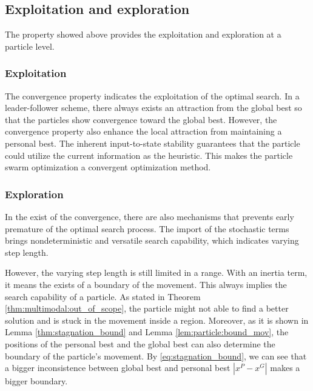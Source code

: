 \subsection{Exploitation and exploration}

The property showed above provides the exploitation and exploration at a particle level.

\subsubsection{Exploitation}

The convergence property indicates the exploitation of the optimal search.
In a leader-follower scheme, there always exists an attraction from the global best so that the particles show convergence toward the global best.
However, the convergence property also enhance the local attraction from maintaining a personal best.
The inherent input-to-state stability guarantees that the particle could utilize the current information as the heuristic.
This makes the particle swarm optimization a convergent optimization method.

\subsubsection{Exploration}

In the exist of the convergence, there are also mechanisms that prevents early premature of the optimal search process.
The import of the stochastic terms brings nondeterministic and versatile search capability, which indicates varying step length.

However, the varying step length is still limited in a range. 
With an inertia term, it means the exists of a boundary of the movement.
This always implies the search capability of a particle.
As stated in Theorem \ref{thm:multimodal:out_of_scope}, the particle might not able to find a better solution and is stuck in the movement inside a region.
Moreover, as it is shown in Lemma \ref{thm:stagnation_bound} and Lemma \ref{lem:particle:bound_mov}, the positions of the personal best and the global best can also determine the boundary of the particle's movement.
By \eqref{eq:stagnation_bound}, we can see that a bigger inconsistence between global best and personal best $ | x^{P} - x^{G} | $ makes a bigger boundary.



